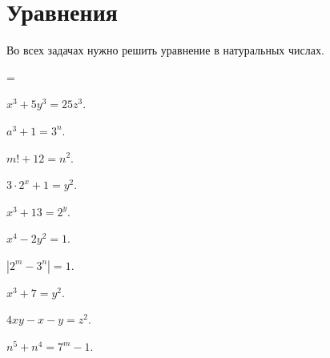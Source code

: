 

\section*{Уравнения}


Во всех задачах нужно решить уравнение в натуральных числах.

\begingroup \multicolsep=\parskip
\begin{multicols}{2}
\begin{problems}


\item
$x^3 + 5 y^3 = 25 z^3$.

\item
$a^3 + 1 = 3^n$.

\item
$m! + 12 = n^2$.

\item
$3 \cdot 2^x + 1 = y^2$.

\item
$x^3 + 13 = 2^y$.

\item
$x^4 - 2 y^2 = 1$.

\item
$|2^m - 3^n| = 1$.

\item
$x^3 + 7 = y^2$.

\item
$4 x y - x - y = z^2$.

\item
$n^5 + n^4 = 7^m - 1$.

\end{problems}
\end{multicols}
\endgroup

